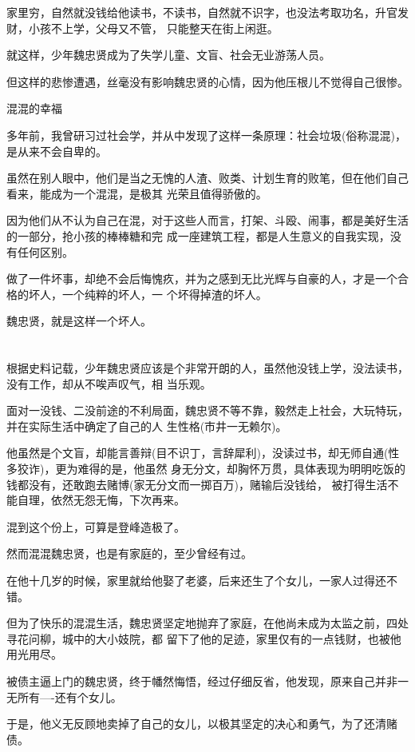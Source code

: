 \documentclass[11pt,a4paper,onecolumn]{article}
\begin{document}
家里穷，自然就没钱给他读书，不读书，自然就不识字，也没法考取功名，升官发财，小孩不上学，父母又不管，
只能整天在街上闲逛。

就这样，少年魏忠贤成为了失学儿童、文盲、社会无业游荡人员。

但这样的悲惨遭遇，丝毫没有影响魏忠贤的心情，因为他压根儿不觉得自己很惨。

混混的幸福

多年前，我曾研习过社会学，并从中发现了这样一条原理：社会垃圾(俗称混混)，是从来不会自卑的。

虽然在别人眼中，他们是当之无愧的人渣、败类、计划生育的败笔，但在他们自己看来，能成为一个混混，是极其
光荣且值得骄傲的。

因为他们从不认为自己在混，对于这些人而言，打架、斗殴、闹事，都是美好生活的一部分，抢小孩的棒棒糖和完
成一座建筑工程，都是人生意义的自我实现，没有任何区别。

做了一件坏事，却绝不会后悔愧疚，并为之感到无比光辉与自豪的人，才是一个合格的坏人，一个纯粹的坏人，一
个坏得掉渣的坏人。

魏忠贤，就是这样一个坏人。

\section[\thesection]{}

根据史料记载，少年魏忠贤应该是个非常开朗的人，虽然他没钱上学，没法读书，没有工作，却从不唉声叹气，相
当乐观。

面对一没钱、二没前途的不利局面，魏忠贤不等不靠，毅然走上社会，大玩特玩，并在实际生活中确定了自己的人
生性格(市井一无赖尔)。

他虽然是个文盲，却能言善辩(目不识丁，言辞犀利)，没读过书，却无师自通(性多狡诈)，更为难得的是，他虽然
身无分文，却胸怀万贯，具体表现为明明吃饭的钱都没有，还敢跑去赌博(家无分文而一掷百万)，赌输后没钱给，
被打得生活不能自理，依然无怨无悔，下次再来。

混到这个份上，可算是登峰造极了。

然而混混魏忠贤，也是有家庭的，至少曾经有过。

在他十几岁的时候，家里就给他娶了老婆，后来还生了个女儿，一家人过得还不错。

但为了快乐的混混生活，魏忠贤坚定地抛弃了家庭，在他尚未成为太监之前，四处寻花问柳，城中的大小妓院，都
留下了他的足迹，家里仅有的一点钱财，也被他用光用尽。

被债主逼上门的魏忠贤，终于幡然悔悟，经过仔细反省，他发现，原来自己并非一无所有----还有个女儿。

于是，他义无反顾地卖掉了自己的女儿，以极其坚定的决心和勇气，为了还清赌债。
\end{document}
